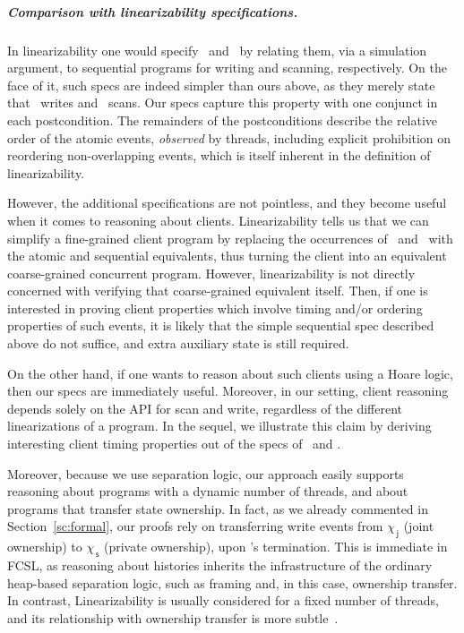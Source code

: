 \documentclass[a4paper,UKenglish]{lipics-v2016}
\newcommand{\selfsub}{\mathsf{s}}
\newcommand{\jointsub}{\mathsf{j}}
\newcommand{\hist}{\chi}
\newcommand{\histS}{\hist_{\, \selfsub}}
\newcommand{\histJ}{\hist_{\, \jointsub}}
\theoremstyle{definition}
\begin{document}
\subparagraph*{Comparison with linearizability specifications.}
%
In linearizability one would specify \jywrite\ and \jyscan\ by
relating them, via a simulation argument, to sequential programs for
writing and scanning, respectively. On the face of it, such specs are
indeed simpler than ours above, as they merely state that
\jywrite\ writes and \jyscan\ scans. Our specs capture this property
with one conjunct in each postcondition. The remainders of the
postconditions describe the relative order of the atomic events,
\emph{observed} by threads, including explicit prohibition on
reordering non-overlapping events, which is itself inherent in the
definition of linearizability.

However, the additional specifications are not pointless, and they
become useful when it comes to reasoning about
clients. Linearizability tells us that we can simplify a fine-grained
client program by replacing the occurrences of \jywrite\ and
\jyscan\ with the atomic and sequential equivalents, thus turning the
client into an equivalent coarse-grained concurrent program. However,
linearizability is not directly concerned with verifying that
coarse-grained equivalent itself.
%
Then, if one is interested in proving client properties which involve
timing and/or ordering properties of such events, it is likely that
the simple sequential spec described above do not suffice, and extra
auxiliary state is still required.

On the other hand, if one wants to reason about such clients using a
Hoare logic, then our specs are immediately useful. Moreover, in our
setting, client reasoning depends solely on the API for scan and
write, regardless of the different linearizations of a program. In the
sequel, we illustrate this claim by deriving interesting client timing
properties out of the specs of \jywrite\ and \jyscan.


Moreover, because we use separation logic, our approach easily
supports reasoning about programs with a dynamic number of threads,
and about programs that transfer state ownership. In fact, as we
already commented in Section~\ref{sc:formal}, our proofs rely on
transferring write events from $\histJ$ (joint ownership) to $\histS$
(private ownership), upon \jywrite's termination.
%
This is immediate in FCSL, as reasoning about histories inherits the
infrastructure of the ordinary heap-based separation logic, such as
framing and, in this case, ownership transfer.
%
In contrast, Linearizability is usually considered for a fixed number
of threads, and its relationship with ownership transfer is more
subtle~\cite{GotsmanY12+CONCUR12, CeroneGY+ICALP14}.
\end{document}

